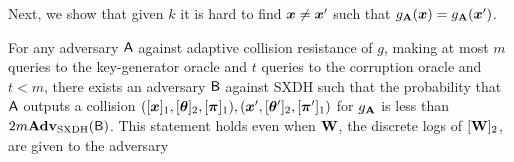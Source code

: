 Next, we show that given $k$  it is hard to find ${\boldsymbol{x}}\neq {\boldsymbol{x}}'$ such that $g_{\mathbf{{A}}}({\boldsymbol{x}})=g_{\mathbf{{A}}}({\boldsymbol{x}}')$. %
%
\begin{lemma} \label{lemma:h-cr-sxdh}
For any adversary $\mathsf{A}$ against adaptive collision resistance of $g$, making at most $m$  queries to the key-generator oracle and $t$ queries to the corruption oracle and $t<m$, there exists an adversary $\mathsf{B}$ against SXDH such that the probability that $\mathsf{A}$ outputs a collision $([{\boldsymbol{x}}]_1,[{\boldsymbol{\theta}}]_2,[{\boldsymbol{\pi}}]_1),({\boldsymbol{x}}',[{\boldsymbol{\theta}}']_2,[{\boldsymbol{\pi}}']_1)$ for $g_{\mathbf{{A}}}$  is less than $2m \mathbf{Adv}_{\mathrm{SXDH}}(\mathsf{B})$. This statement holds even when $\mathbf{{W}}$, the discrete logs of $[\mathbf{{W}}]_2$, are given to the adversary 
\end{lemma}
